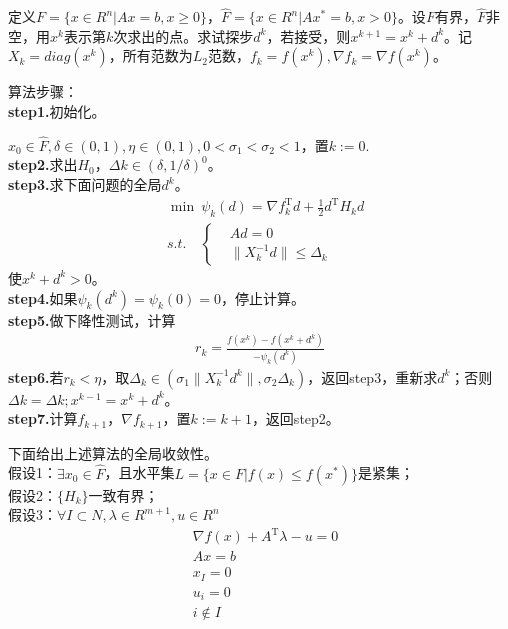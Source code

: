             \par
            定义$F=\{x\in R^n|Ax=b,x\geqslant 0\}$，$\hat{F}=\{x\in R^n|Ax^*=b,x > 0\}$。设$F$有界，$\hat{F}$非空，用$x^k$表示第$k$次求出的点。求试探步$d^k$，若接受，则$x^{k+1}=x^k+d^k$。记$X_k=diag(x^k)$，所有范数为$L_2$范数，$f_k=f(x^k),\nabla f_k=\nabla f(x^k)$。
            \par
            算法步骤：\\
            \textbf{step1.}初始化。
            \par
            $x_0\in \hat{F},\delta \in (0,1),\eta \in (0,1),0<{\sigma}_1<{\sigma}_2<1$，置$k:=0$.\\
            \textbf{step2.}求出$H_0$，$\Delta k\in(\delta,1/\delta)^0$。\\
            \textbf{step3.}求下面问题的全局$d^k$。
            \begin{align*}
            &\mathop{\min} \  {\psi}_k(d)={\nabla}f_k^\mathrm{T} d+\frac 12 d^\mathrm{T} H_kd\\
            &s.t.\quad \left\{
            \begin{aligned}
            &Ad=0 \\
            &\|X_k^{-1}d\|\leqslant {\Delta}_k
            \end{aligned}
                \right.
            \end{align*}
            使$x^k+d^k>0$。\\
            \textbf{step4.}如果${\psi}_k(d^k)={\psi}_k(0)=0$，停止计算。\\
            \textbf{step5.}做下降性测试，计算
            \begin{align*}
                r_k=\frac{f(x^k)-f(x^k+d^k)}{-{\psi}_k(d^k)}
            \end{align*}
            \textbf{step6.}若$r_k<\eta$，取${\Delta}_k\in ({\sigma}_1\|X_k^{-1}d^k\|,{\sigma}_2{\Delta}_k)$，返回step3，重新求$d^k$；否则$\Delta k = \Delta k;x^{k-1} = x^k+d^k$。\\
            \textbf{step7.}计算$f_{k+1}$，$\nabla f_{k+1}$，置$k:=k+1$，返回step2。
            \par
            下面给出上述算法的全局收敛性。\\
            假设1：$\exists x_0 \in \hat{F}$，且水平集$L=\{x\in F|f(x)\leqslant f(x^*)\}$是紧集；\\
            假设2：$\{H_k\}$一致有界；\\
            假设3：$\forall I\subset N,{\lambda}\in R^{m+1},u\in R^n$
            \begin{align*}
            & \nabla f(x)+A^\mathrm{T} \lambda -u =  0\\
            & Ax = b\\
            & x_I = 0\\
            & u_i = 0\\
            & i \notin I
            \end{align*}
